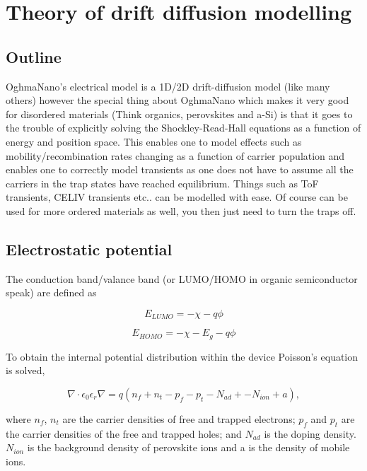 \chapter{Theory of drift diffusion modelling}
\label{sec:electrical}

\section{Outline}
OghmaNano's electrical model is a 1D/2D drift-diffusion model (like many others) however the special thing about OghmaNano which makes it very good for disordered materials (Think organics, perovskites and a-Si) is that it goes to the trouble of explicitly solving the Shockley-Read-Hall equations as a function of energy and position space.  This enables one to model effects such as mobility/recombination rates changing as a function of carrier population and enables one to correctly model transients as one does not have to assume all the carriers in the trap states have reached equilibrium.  Things such as ToF transients, CELIV transients etc.. can be modelled with ease. Of course can be used for more ordered materials as well, you then just need to turn the traps off.


\section{Electrostatic potential}
The conduction band/valance band (or LUMO/HOMO in organic semiconductor speak) are defined as

\begin{equation}
E_{LUMO}=-\chi-q\phi
\end{equation}

\begin{equation}
E_{HOMO}=-\chi-E_g-q\phi
\end{equation}

To obtain the internal potential distribution within the device Poisson's equation is solved,

\begin{equation}
\label{eq:pos}
\nabla \cdot \epsilon_0 \epsilon_r \nabla = q (n_{f}+n_{t}-p_{f}-p_{t}-N_{ad}+-N_{ion}+a),
\end{equation}

where $n_{f}$, $n_{t}$ are the carrier densities of free and trapped electrons; $p_{f}$ and $p_{t}$ are the carrier densities of the free and trapped holes; and $N_{ad}$ is the doping density. $N_{ion}$ is the background density of perovskite ions and a is the density of mobile ions.

